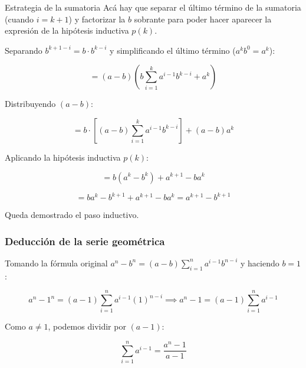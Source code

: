 \documentclass[11pt]{article}
\begin{document}
\begin{mynote}{Estrategia de la sumatoria}
Acá hay que separar el último término de la sumatoria (cuando $i = k+1$) y factorizar la $b$ sobrante para poder hacer aparecer la expresión de la hipótesis inductiva $p(k)$.
\end{mynote}

Separando $b^{k+1-i} = b \cdot b^{k-i}$ y simplificando el último término ($a^k b^0 = a^k$):

\[
= (a-b) \left( b \sum_{i=1}^{k} a^{i-1}b^{k-i} + a^k \right)
\]

Distribuyendo $(a-b)$:

\[
= b \cdot \left[ (a-b)\sum_{i=1}^{k} a^{i-1}b^{k-i} \right] + (a-b)a^k
\]

Aplicando la hipótesis inductiva $p(k)$:

\[
= b(a^k - b^k) + a^{k+1} - ba^k
\]

\[
= ba^k - b^{k+1} + a^{k+1} - ba^k = a^{k+1} - b^{k+1}
\]

Queda demostrado el paso inductivo.

\vspace{0.5cm}

\subsubsection*{Deducción de la serie geométrica}

Tomando la fórmula original $a^n - b^n = (a-b)\sum_{i=1}^{n} a^{i-1}b^{n-i}$ y haciendo $b = 1$:

\[
a^n - 1^n = (a-1)\sum_{i=1}^{n} a^{i-1}(1)^{n-i} \implies a^n - 1 = (a-1)\sum_{i=1}^{n} a^{i-1}
\]

Como $a \neq 1$, podemos dividir por $(a-1)$:

\[
\sum_{i=1}^{n} a^{i-1} = \frac{a^n - 1}{a - 1}
\]
\end{document}
